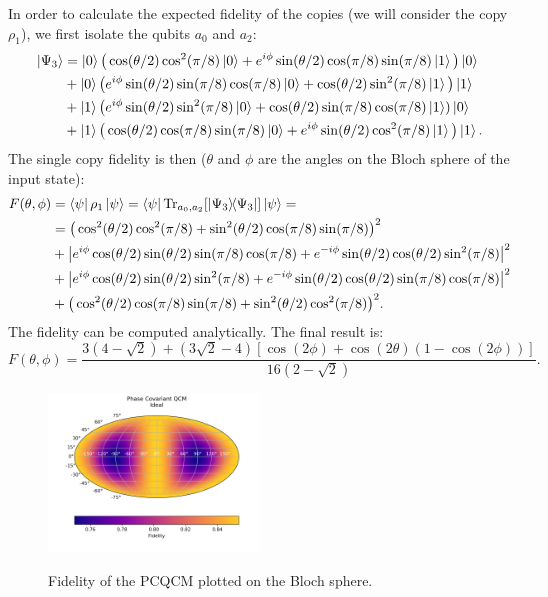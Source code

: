In order to calculate the expected fidelity of the copies (we will consider the copy $\rho_{1}$), we first isolate the qubits $a_0$ and $a_2$:
\[
    \begin{split}
    \ket{\Psi_3}&=\ket{0}\big(\cos(\theta/2)\cos^2(\pi/8)\ket{0}+e^{i\phi}\sin(\theta/2)\cos(\pi/8)\sin(\pi/8)\ket{1}\big)\ket{0}\\
    &+\ket{0}\big(e^{i\phi}\sin(\theta/2)\sin(\pi/8)\cos(\pi/8)\ket{0}+\cos(\theta/2)\sin^2(\pi/8)\ket{1}\big)\ket{1}\\
    &+\ket{1}\big(e^{i\phi}\sin(\theta/2)\sin^2(\pi/8)\ket{0}+\cos(\theta/2)\sin(\pi/8)\cos(\pi/8)\ket{1})\ket{0}\\
    &+\ket{1}\big(\cos(\theta/2)\cos(\pi/8)\sin(\pi/8)\ket{0}+e^{i\phi}\sin(\theta/2)\cos^2(\pi/8)\ket{1}\big)\ket{1}.
    \end{split}
\]
The single copy fidelity is then ($\theta$ and $\phi$ are the angles on the Bloch sphere of the input state):
\[
    \begin{split}
    F(\theta,\phi)&=\bra{\psi}\rho_{1}\ket{\psi}=\bra{\psi}\Tr_{a_0,a_2}[\ketbra{\Psi_3}]\ket{\psi}=\\
    &=\big(\cos^2(\theta/2)\cos^2(\pi/8)+\sin^2(\theta/2)\cos(\pi/8)\sin(\pi/8)\big)^2\\
    &+\big|e^{i\phi}\cos(\theta/2)\sin(\theta/2)\sin(\pi/8)\cos(\pi/8)+e^{-i\phi}\sin(\theta/2)\cos(\theta/2)\sin^2(\pi/8)\big|^2\\
    &+\big|e^{i\phi}\cos(\theta/2)\sin(\theta/2)\sin^2(\pi/8)+e^{-i\phi}\sin(\theta/2)\cos(\theta/2)\sin(\pi/8)\cos(\pi/8)\big|^2\\
    &+\big(\cos^2(\theta/2)\cos(\pi/8)\sin(\pi/8)+\sin^2(\theta/2)\cos^2(\pi/8)\big)^2.
    \end{split}
\]
The fidelity can be computed analytically. The final result is:
\begin{equation}
    F(\theta,\phi)=\frac{3\left(4-\sqrt{2}\right)+\left(3\sqrt{2}-4\right)\left[\cos(2\phi)+\cos(2\theta)\left(1-\cos(2\phi)\right)\right]}{     16(2-\sqrt{2})   }.
\end{equation}
\begin{figure}[H]
    \centering
            \includegraphics[width=0.5\textwidth]{Figures/phase_covariant.png}
        \label{fig:phase_covariant}
        \caption{Fidelity of the PCQCM plotted on the Bloch sphere.}
\end{figure}
